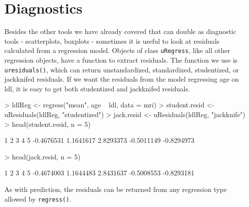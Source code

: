 \documentclass[landscape]{article}
\renewenvironment{Schunk}{\vspace{\topsep}}{\vspace{\topsep}}
\begin{document}
\section{Diagnostics}
Besides the other tools we have already covered that can double as diagnostic tools - scatterplots, boxplots - sometimes it is useful to look at residuals calculated from a regression model. Objects of class \texttt{uRegress}, like all other regression objects, have a function to extract residuals. The function we use is \texttt{uresiduals()}, which can return unstandardized, standardized, studentized, or jackknifed residuals. If we want the residuals from the model regressing age on ldl, it is easy to get both studentized and jackknifed residuals.
\begin{Schunk}
\begin{Sinput}
> ldlReg <- regress("mean", age ~ ldl, data = mri)
> student.resid <- uResiduals(ldlReg, "studentized")
> jack.resid <- uResiduals(ldlReg, "jackknife")
> head(student.resid, n = 5)
\end{Sinput}
\begin{Soutput}
         1          2          3          4          5 
-0.4676531  1.1641617  2.8293373 -0.5011149 -0.8294973 
\end{Soutput}
\begin{Sinput}
> head(jack.resid, n = 5)
\end{Sinput}
\begin{Soutput}
         1          2          3          4          5 
-0.4674003  1.1644483  2.8431637 -0.5008553 -0.8293181 
\end{Soutput}
\end{Schunk}

As with prediction, the residuals can be returned from any regression type allowed by \texttt{regress()}.
\end{document}
